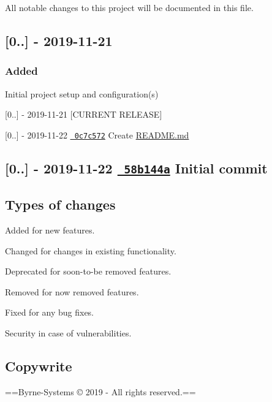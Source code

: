 All notable changes to this project will be documented in this file.

\subsection*{\mbox{[}0..\mbox{]} -\/ 2019-\/11-\/21}

\subsubsection*{Added}


\begin{DoxyItemize}
\item Initial project setup and configuration(s)
\end{DoxyItemize}



 \mbox{[}0..\mbox{]} -\/ 2019-\/11-\/21 \mbox{[}C\+U\+R\+R\+E\+NT R\+E\+L\+E\+A\+SE\mbox{]}

\mbox{[}0..\mbox{]} -\/ 2019-\/11-\/22 \href{https://github.com/Justin-Byrne/Dice/commit/0c7c5723ca221c5caf1edbd2dedef85f6f5c1418}{\texttt{ 0c7c572}} Create \mbox{\hyperlink{_r_e_a_d_m_e_8md}{R\+E\+A\+D\+M\+E.\+md}}

\subsection*{\mbox{[}0..\mbox{]} -\/ 2019-\/11-\/22 \href{https://github.com/Justin-Byrne/Dice/commit/58b144aa46db181f5d26e6bda5c477c476fd2f81}{\texttt{ 58b144a}} Initial commit }

\subsection*{Types of changes}


\begin{DoxyItemize}
\item {\ttfamily Added} for new features.
\item {\ttfamily Changed} for changes in existing functionality.
\item {\ttfamily Deprecated} for soon-\/to-\/be removed features.
\item {\ttfamily Removed} for now removed features.
\item {\ttfamily Fixed} for any bug fixes.
\item {\ttfamily Security} in case of vulnerabilities.
\end{DoxyItemize}

\subsection*{Copywrite}



==Byrne-\/\+Systems © 2019 -\/ All rights reserved.== 